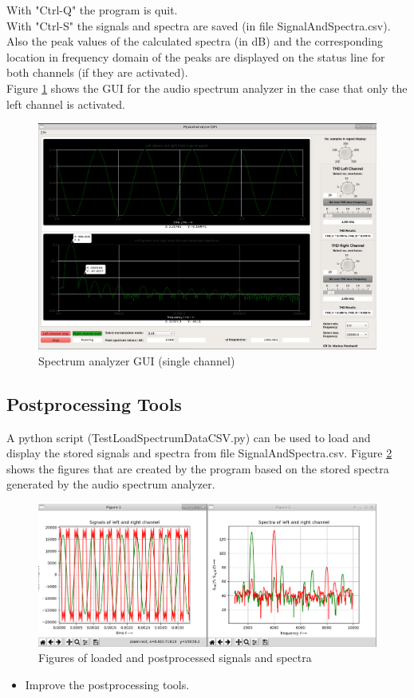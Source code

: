 \documentclass[11pt, oneside]{scrartcl}   	%
\begin{document}
With "Ctrl-Q" the program is quit. \\

With "Ctrl-S" the signals and spectra are saved (in file SignalAndSpectra.csv).\\

Also the peak values of the calculated spectra (in dB) and the corresponding location in frequency domain of the peaks are displayed on the status line for both channels (if they are activated).\\

Figure \ref{fig:SpectrumAnalyzerGUI2} shows the GUI for the audio spectrum analyzer in the case that only the left channel is activated.
\begin{figure}[tbph]
	\centering
	\includegraphics[width=\linewidth]{MyAudioSpectrumAnalyzerGUILeftChannel.png}
	\caption[Spectrum analyzer GUI (single channel)]{Spectrum analyzer GUI (single channel)}
	\label{fig:SpectrumAnalyzerGUI2}
\end{figure}

\subsection{Postprocessing Tools}
A python script (TestLoadSpectrumDataCSV.py) can be used to load and display the stored signals and spectra from file SignalAndSpectra.csv.
Figure \ref{fig:TestLoadSpectraCSVDisplays} shows the figures that are created by the program based on the stored spectra generated by the audio spectrum analyzer.
\begin{figure}[tbph]
	\centering
	\includegraphics[width=\linewidth]{TestLoadSpectraCSVDisplays.png}
	\caption[Figures of loaded and postprocessed signals and spectra]{Figures of loaded and postprocessed signals and spectra}
	\label{fig:TestLoadSpectraCSVDisplays}
\end{figure}

\begin{itemize}
	\item Improve the postprocessing tools.
\end{itemize}
\end{document}
